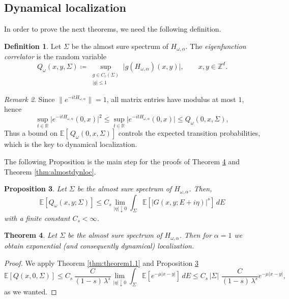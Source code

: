 \documentclass[11pt, a4paper, UKenglish, oneside]{book}
\theoremstyle{plain}
\newtheorem{theorem}{Theorem}
\newtheorem{proposition}[theorem]{Proposition}
\theoremstyle{remark}
\newtheorem{remark}[theorem]{Remark}
\theoremstyle{definition}
\newtheorem{definition}[theorem]{Definition}
\numberwithin{equation}{section}
\numberwithin{theorem}{section}
\begin{document}
\subsection*{Dynamical localization}
In order to prove the next theorems, we need the following definition.
\begin{definition}\label{def:Q}
    Let $\Sigma$ be the almost sure spectrum of $H_{\omega,\alpha}$. The
    \textit{eigenfunction correlator} is the random variable
    \begin{equation}
        Q_\omega(x,y,\Sigma) \coloneqq \sup_{\substack{g \in C_c(\Sigma) \\ |g| \le 1}}
        \bigl| g(H_{\omega,\alpha})(x,y) \bigr|, \qquad x,y \in \mathbb{Z}^d.
    \end{equation}
\end{definition}
\begin{remark}
    Since $\|e^{-itH_{\omega,\alpha}}\|=1$, all matrix entries have modulus at most $1$, hence
    \[
        \sup_{t\in\mathbb{R}} \bigl|e^{-itH_{\omega,\alpha}}(0,x)\bigr|^2
        \le \sup_{t\in\mathbb{R}} \bigl|e^{-itH_{\omega,\alpha}}(0,x)\bigr|
        \le Q_\omega(0,x,\Sigma),
    \]
    Thus a bound on
    $\mathbb{E}[\,Q_\omega(0,x,\Sigma)]$ controls the expected transition probabilities, which is
    the key to dynamical localization.
\end{remark}
The following Proposition is the main step for the proofs of Theorem \ref{thm:explocproof} and Theorem \ref{thm:almostdynloc}.
\begin{proposition}\label{prop:almostloc}
    Let $\Sigma$ be the almost sure spectrum of $H_{\omega,\alpha}$. Then,
    \begin{equation}
        \mathbb{E}[Q_\omega(x,y;\Sigma)] \le C_s \lim_{|\eta| \downarrow 0} \int_\Sigma \mathbb{E}[|G(x,y;E+i\eta)|^s] \, dE
    \end{equation}
    with a finite constant $C_s < \infty$.
\end{proposition}

\begin{theorem}\label{thm:explocproof}
    Let $\Sigma$ be the almost sure spectrum of $H_{\omega,\alpha}$. Then for $\alpha=1$ we obtain exponential (and consequently dynamical) localization.
\end{theorem}
\begin{proof}
    We apply Theorem \ref{thm:theorem1.1} and Proposition \ref{prop:almostloc}
    \begin{equation}
        \mathbb{E}[Q(x,0,\Sigma)] \le C_s\,\frac{C}{(1-s)\,\lambda^s}\lim_{|\eta| \downarrow 0} \int_\Sigma \mathbb{E}[e^{-\mu|x-y|}] \, dE \le C_s\, |\Sigma|\,\,\frac{C}{(1-s)\,\lambda^s} e^{-\mu|x-y|}, 
    \end{equation}
    as we wanted.
\end{proof}
\end{document}
